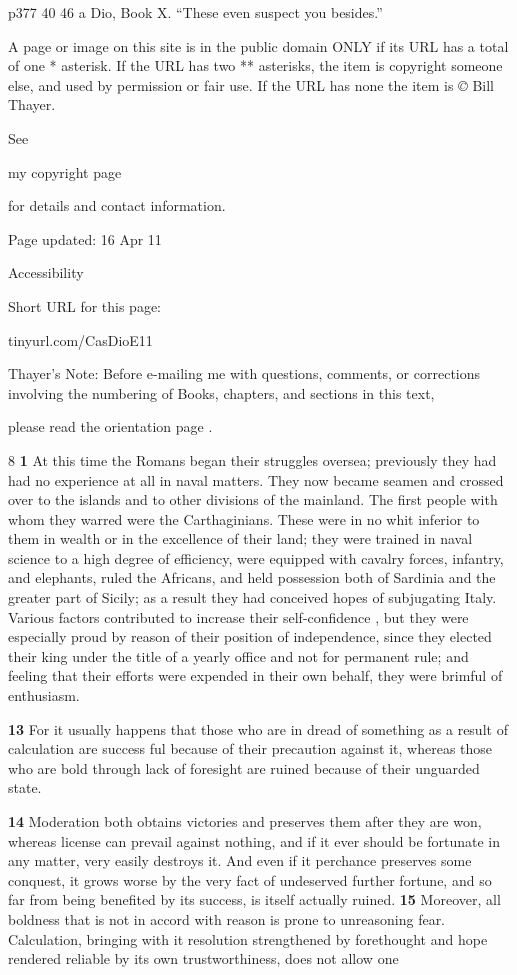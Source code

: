 p377
40
46 a Dio, Book X. ``These even suspect you besides.''

A page or image on this site is in the public domain ONLY if its URL has a total of one * asterisk. If the URL has two ** asterisks, the item is copyright someone else, and used by permission or fair use. If the URL has none the item is \emph{©} Bill Thayer.

See

my copyright page

for details and contact information.

Page updated:
16 Apr 11

Accessibility


Short URL for this page:

tinyurl.com/CasDioE11

Thayer's Note: Before e-mailing me with questions, comments, or corrections involving the numbering of Books, chapters, and sections in this text,

please read the orientation page .

8 \textbf{1} At this time the Romans began their struggles oversea; previously they had had no experience at all in naval matters. They now became seamen and crossed over to the islands and to other divisions of the mainland. The first people with whom they warred were the Carthaginians. These were in no whit inferior to them in wealth or in the excellence of their land; they were trained in naval science to a high degree of efficiency, were equipped with cavalry forces, infantry, and elephants, ruled the Africans, and held possession both of Sardinia and the greater part of Sicily; as a result they had conceived hopes of subjugating Italy. Various factors contributed to increase their self-confidence , but they were especially proud by reason of their position of independence, since they elected their king under the title of a yearly office and not for permanent rule; and feeling that their efforts were expended in their own behalf, they were brimful of enthusiasm.

\textbf{13}
For it usually happens that those who are in dread of something as a result of calculation are success ­ful because of their precaution against it, whereas those who are bold through lack of foresight are ruined because of their unguarded state.

\textbf{14}
Moderation both obtains victories and preserves them after they are won, whereas license can prevail against nothing, and if it ever should be fortunate in any matter, very easily destroys it. And even if it perchance preserves some conquest, it grows worse by the very fact of undeserved further fortune, and so far from being benefited by its success, is itself actually ruined. \textbf{15} Moreover, all boldness that is not in accord with reason is prone to unreasoning fear. Calculation, bringing with it resolution strengthened by forethought and hope rendered reliable by its own trustworthiness, does not allow one

